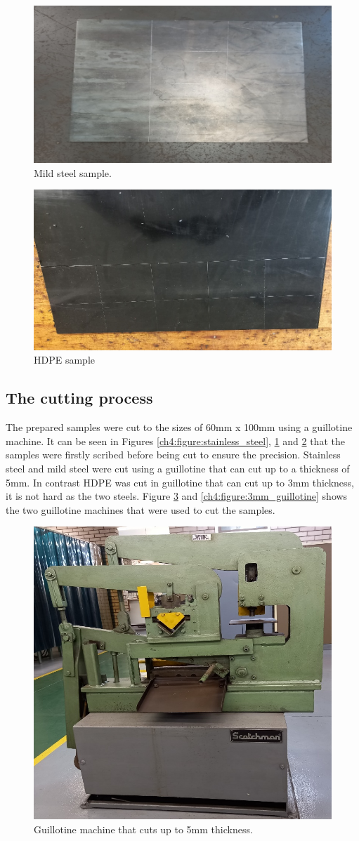 \documentclass[12pt]{report}
\begin{document}
\begin{figure}[H]
    \centering
    \includegraphics[width=.55\textwidth]{mild_steel_sample.jpg}
    \caption{Mild steel sample.}
    \label{ch4:figure:mild_steel}
\end{figure}

\begin{figure}[H]
    \centering
    \includegraphics[width=.55\textwidth]{hdpe_sample.jpg}
    \caption{HDPE sample}
    \label{ch4:figure:hdpe}
\end{figure}

\subsection{The cutting process}
The prepared samples were cut to the sizes of 60mm x 100mm using a guillotine machine. It can be seen in Figures \ref{ch4:figure:stainless_steel}, \ref{ch4:figure:mild_steel} and \ref{ch4:figure:hdpe} that the samples were firstly scribed before being cut to ensure the precision. Stainless steel and mild steel were cut using a guillotine that can cut up to a thickness of 5mm. In contrast HDPE was cut in guillotine that can cut up to 3mm thickness, it is not hard as the two steels. Figure \ref{ch4:figure:5mm_guillotine} and \ref{ch4:figure:3mm_guillotine} shows the two guillotine machines that were used to cut the samples.
 
\begin{figure}[H]
    \centering
    \includegraphics[width=.4\textwidth]{5mm_guillootine_machine.jpg}
    \caption{Guillotine machine that cuts up to 5mm thickness.}
    \label{ch4:figure:5mm_guillotine}
\end{figure}
 
\end{document}
